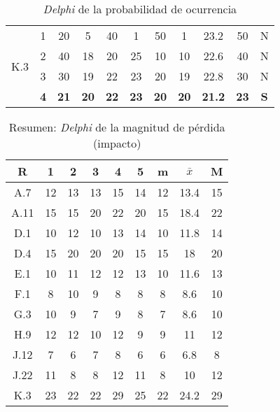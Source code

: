 \documentclass[11pt,a4paper,spanish,twoside]{book}
\begin{document}
\begin{table}[!h]
\begin{tabular}{|c|c||c|c|c|c|c||c|c|c||c|}
    \hline \multirow{4}{*}{K.3} 
    & 1 & 20 & 5  & 40 & 1  & 50 & 1  & 23.2 & 50 & N \\
    & 2 & 40 & 18 & 20 & 25 & 10 & 10 & 22.6 & 40 & N \\
    & 3 & 30 & 19 & 22 & 23 & 20 & 19 & 22.8 & 30 & N \\
    & \textbf{4} & \textbf{21} & \textbf{20} & \textbf{22} & \textbf{23} &
    \textbf{20} & \textbf{20} & \textbf{21.2} & \textbf{23} & \textbf{S} \\ 
    \hline
   \end{tabular}
  \caption{\emph{Delphi} de la probabilidad de ocurrencia}
  \label{Tab:DELPHIpro}
\end{table}

\begin{table}[!h]
\centering
  \begin{tabular}{|c||c|c|c|c|c||c|c|c|}
    \hline
    \textbf{R} & \textbf{1} & \textbf{2} & \textbf{3} & \textbf{4} &
    \textbf{5} & \textbf{m} &\textbf{$\bar{x}$} &\textbf{M} \\
    \hline \hline
    A.7  & 12 & 13 & 13 & 15 & 14 & 12 & 13.4 & 15 \\ \hline
    A.11 & 15 & 15 & 20 & 22 & 20 & 15 & 18.4 & 22 \\ \hline
    D.1  & 10 & 12 & 10 & 13 & 14 & 10 & 11.8 & 14 \\ \hline
    D.4  & 15 & 20 & 20 & 20 & 15 & 15 & 18   & 20 \\ \hline
    E.1  & 10 & 11 & 12 & 12 & 13 & 10 & 11.6 & 13 \\ \hline
    F.1  & 8  & 10 & 9  & 8  & 8  & 8  & 8.6  & 10 \\ \hline
    G.3  & 10 & 9  & 7  & 9  & 8  & 7  & 8.6  & 10 \\ \hline
    H.9  & 12 & 12 & 10 & 12 & 9  & 9  & 11   & 12 \\ \hline
    J.12 & 7  & 6  & 7  & 8  & 6  & 6  & 6.8  & 8  \\ \hline
    J.22 & 11 & 8  & 8  & 12 & 11 & 8  & 10   & 12 \\ \hline
    K.3  & 23 & 22 & 22 & 29 & 25 & 22 & 24.2 & 29 \\ \hline
  \end{tabular}
  \caption{Resumen: \emph{Delphi} de la magnitud de pérdida (impacto)}
  \label{Tab:ResDELPHImag}
\end{table}
\end{document}
